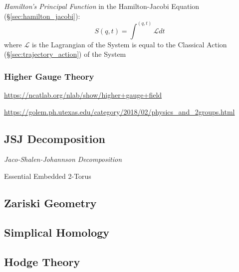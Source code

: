 \emph{Hamilton's Principal Function} in the Hamilton-Jacobi Equation
(\S\ref{sec:hamilton_jacobi}):
\[
  S(q,t) = \int^{(q,t)} \mathcal{L} dt
\]
where $\mathcal{L}$ is the Lagrangian of the System is equal to the Classical
Action (\S\ref{sec:trajectory_action}) of the System



\subsubsection{Higher Gauge Theory}\label{sec:higher_gauge_theory}

\url{https://ncatlab.org/nlab/show/higher+gauge+field}

\url{https://golem.ph.utexas.edu/category/2018/02/physics_and_2groups.html}



\subsection{JSJ Decomposition}\label{sec:jsj_decomposition}

\emph{Jaco-Shalen-Johannson Decomposition}

Essential Embedded 2-Torus



\subsection{Zariski Geometry}\label{sec:zariski_geometry}

\subsection{Simplical Homology}\label{sec:simplical_homology}

\subsection{Hodge Theory}\label{sec:hodge_theory}

